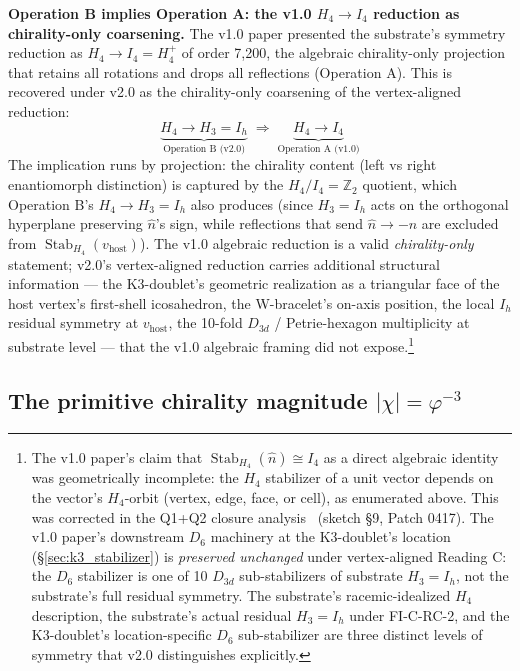 \documentclass[11pt,letterpaper]{article}
\newcommand{\phig}{\varphi}
\newcommand{\Dsix}{D_6}
\newcommand{\Hfour}{H_4}
\newcommand{\Ifour}{I_4}
\newcommand{\Stab}{\operatorname{Stab}}
\begin{document}
\textbf{Operation B implies Operation A: the v1.0 $\Hfour \to \Ifour$ reduction as chirality-only coarsening.} The v1.0 paper presented the substrate's symmetry reduction as $\Hfour \to \Ifour = H_4^+$ of order 7{,}200, the algebraic chirality-only projection that retains all rotations and drops all reflections (Operation A). This is recovered under v2.0 as the chirality-only coarsening of the vertex-aligned reduction:
\[
\underbrace{\Hfour \to H_3 = I_h}_{\text{Operation B (v2.0)}} \;\Longrightarrow\; \underbrace{\Hfour \to \Ifour}_{\text{Operation A (v1.0)}}
\]
The implication runs by projection: the chirality content (left vs right enantiomorph distinction) is captured by the $\Hfour / \Ifour = \mathbb{Z}_2$ quotient, which Operation B's $\Hfour \to H_3 = I_h$ also produces (since $H_3 = I_h$ acts on the orthogonal hyperplane preserving $\hat{n}$'s sign, while reflections that send $\hat{n} \to -\hat{n}$ are excluded from $\Stab_{\Hfour}(v_{\text{host}})$). The v1.0 algebraic reduction is a valid \emph{chirality-only} statement; v2.0's vertex-aligned reduction carries additional structural information --- the K3-doublet's geometric realization as a triangular face of the host vertex's first-shell icosahedron, the W-bracelet's on-axis position, the local $I_h$ residual symmetry at $v_{\text{host}}$, the 10-fold $D_{3d}$ / Petrie-hexagon multiplicity at substrate level --- that the v1.0 algebraic framing did not expose.\footnote{The v1.0 paper's claim that $\Stab_{\Hfour}(\hat{n}) \cong \Ifour$ as a direct algebraic identity was geometrically incomplete: the $\Hfour$ stabilizer of a unit vector depends on the vector's $\Hfour$-orbit (vertex, edge, face, or cell), as enumerated above. This was corrected in the Q1+Q2 closure analysis~\cite{abshier_capotauro_chiral_mechanism_sketch} (sketch \S9, Patch 0417). The v1.0 paper's downstream $\Dsix$ machinery at the K3-doublet's location (\S\ref{sec:k3_stabilizer}) is \emph{preserved unchanged} under vertex-aligned Reading C: the $\Dsix$ stabilizer is one of 10 $D_{3d}$ sub-stabilizers of substrate $H_3 = I_h$, not the substrate's full residual symmetry. The substrate's racemic-idealized $\Hfour$ description, the substrate's actual residual $H_3 = I_h$ under FI-C-RC-2, and the K3-doublet's location-specific $\Dsix$ sub-stabilizer are three distinct levels of symmetry that v2.0 distinguishes explicitly.}

\subsection{The primitive chirality magnitude $|\chi| = \phig^{-3}$}\label{sec:order_parameter}
\end{document}
